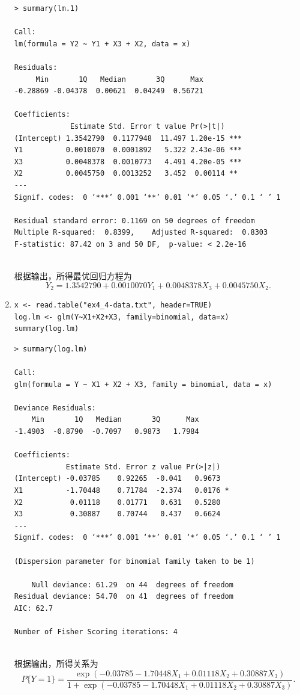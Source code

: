 \begin{enumerate}
\begin{lstlisting}
> summary(lm.1)

Call:
lm(formula = Y2 ~ Y1 + X3 + X2, data = x)

Residuals:
     Min       1Q   Median       3Q      Max 
-0.28869 -0.04378  0.00621  0.04249  0.56721 

Coefficients:
             Estimate Std. Error t value Pr(>|t|)    
(Intercept) 1.3542790  0.1177948  11.497 1.20e-15 ***
Y1          0.0010070  0.0001892   5.322 2.43e-06 ***
X3          0.0048378  0.0010773   4.491 4.20e-05 ***
X2          0.0045750  0.0013252   3.452  0.00114 ** 
---
Signif. codes:  0 ‘***’ 0.001 ‘**’ 0.01 ‘*’ 0.05 ‘.’ 0.1 ‘ ’ 1

Residual standard error: 0.1169 on 50 degrees of freedom
Multiple R-squared:  0.8399,	Adjusted R-squared:  0.8303 
F-statistic: 87.42 on 3 and 50 DF,  p-value: < 2.2e-16
\end{lstlisting}
        \summary\\
        根据输出，所得最优回归方程为\[Y_2 = 1.3542790+0.0010070Y_1+0.0048378X_3+0.0045750X_2.\]
        \item
        \code
\begin{lstlisting}
x <- read.table("ex4_4-data.txt", header=TRUE)
log.lm <- glm(Y~X1+X2+X3, family=binomial, data=x)
summary(log.lm)
\end{lstlisting}
        \out
\begin{lstlisting}
> summary(log.lm)

Call:
glm(formula = Y ~ X1 + X2 + X3, family = binomial, data = x)

Deviance Residuals: 
    Min       1Q   Median       3Q      Max  
-1.4903  -0.8790  -0.7097   0.9873   1.7984  

Coefficients:
            Estimate Std. Error z value Pr(>|z|)  
(Intercept) -0.03785    0.92265  -0.041   0.9673  
X1          -1.70448    0.71784  -2.374   0.0176 *
X2           0.01118    0.01771   0.631   0.5280  
X3           0.30887    0.70744   0.437   0.6624  
---
Signif. codes:  0 ‘***’ 0.001 ‘**’ 0.01 ‘*’ 0.05 ‘.’ 0.1 ‘ ’ 1

(Dispersion parameter for binomial family taken to be 1)

    Null deviance: 61.29  on 44  degrees of freedom
Residual deviance: 54.70  on 41  degrees of freedom
AIC: 62.7

Number of Fisher Scoring iterations: 4
\end{lstlisting}
        \summary\\
        根据输出，所得关系为
        \[P\{Y=1\}=\frac{\exp(-0.03785-1.70448X_1+0.01118X_2+0.30887X_3)}{1+\exp(-0.03785-1.70448X_1+0.01118X_2+0.30887X_3)}.\]
    \end{enumerate}
\clearpage